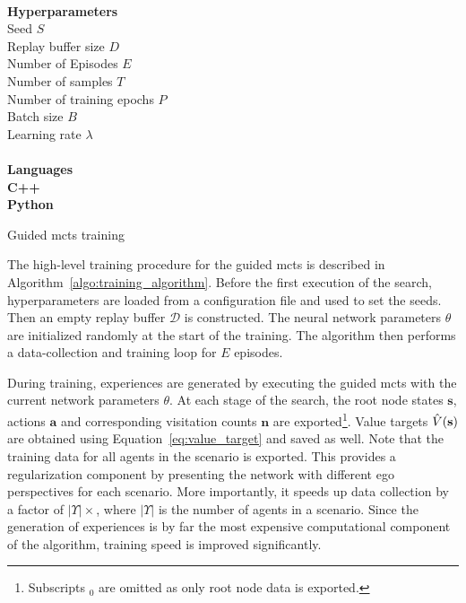 \begin{algorithm}[ht]
\begin{multicols}{2}
{ ~\\
 }
 {
 \textbf{Hyperparameters}\\
 Seed $S$\\
 Replay buffer size $D$\\
 Number of Episodes $E$\\
 Number of samples $T$\\
 Number of training epochs $P$\\
 Batch size $B$\\
 Learning rate $\lambda$\\ 
 ~\\
 }
  {
 \textbf{Languages}\\
 \textcolor{cppgreen}{ \textbf{C++}}\\
 \textcolor{pyblue}{ \textbf{Python}}\\
  }
 \end{multicols}
 \caption{Guided \gls{mcts} training}
 \label{algo:training_algorithm}
\end{algorithm}
The high-level training procedure for the guided \gls{mcts} is described in Algorithm~\ref{algo:training_algorithm}. Before the first execution of the search, hyperparameters are loaded from a configuration file and used to set the seeds. Then an empty replay buffer $\mathcal D$ is constructed. The neural network parameters $\theta$ are initialized randomly at the start of the training. The algorithm then performs a data-collection and training loop for $E$ episodes.

During training, experiences are generated by executing the guided \gls{mcts} with the current network parameters $\theta$. At each stage of the search, the root node states $\mathbf s$, actions $\mathbf a$ and corresponding visitation counts $\mathbf n$ are exported\footnote{Subscripts $_0$ are omitted as only root node data is exported.}. Value targets $\Vtarget$ are obtained using Equation~\ref{eq:value_target} and saved as well. Note that the training data for all agents in the scenario is exported. This provides a regularization component by presenting the network with different ego perspectives for each scenario. More importantly, it speeds up data collection by a factor of $|\Upsilon| \times$, where $|\Upsilon|$ is the number of agents in a scenario. Since the generation of experiences is by far the most expensive computational component of the algorithm, training speed is improved significantly.

